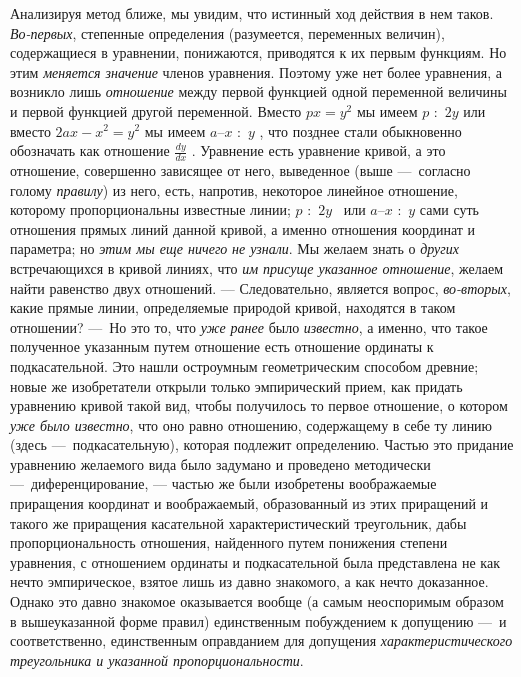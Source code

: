 {Анализируя метод ближе, мы увидим, что истинный ход действия в нем таков.
{\em Во-первых}, степенные определения (разумеется,
переменных величин), содержащиеся в уравнении, понижаются, приводятся к их
первым функциям. Но этим {\em меняется значение} членов
уравнения. Поэтому уже нет более уравнения, а возникло лишь
{\em отношение} между первой функцией одной переменной
величины и первой функцией другой переменной. Вместо  $\mathit{px}=y^2$  мы
имеем  $p\text{~}:\text{~}2y$  или вместо  $2\mathit{ax}-x^2=y^2$ мы имеем 
$a\text{–}x\text{~}:\text{~}y$ , что позднее стали обыкновенно обозначать
как отношение  $\frac{\mathit{dy}}{\mathit{dx}}$ . Уравнение есть уравнение
кривой, а это отношение, совершенно зависящее от него, выведенное (выше
—~согласно голому {\em правилу}) из него, есть,
напротив, некоторое линейное отношение, которому пропорциональны известные
линии;  $p\text{~}:\text{~}2y$  \ или  $a\text{–}x\text{~}:\text{~}y$  сами
суть отношения прямых линий данной кривой, а именно отношения координат и
параметра; но {\em этим мы еще ничего
}{\em не узнали}. Мы желаем знать о
{\em других} встречающихся в кривой линиях, что
{\em им присуще указанное отношение}, желаем найти
равенство двух отношений. — Следовательно, является вопрос,
{\em во-вторых}, какие прямые линии, определяемые
природой кривой, находятся в таком отношении? —~Но это то, что
{\em уже ранее} было
{\em известно}, а именно, что такое полученное
указанным путем отношение есть отношение ординаты к подкасательной. Это
нашли остроумным геометрическим способом древние; новые же изобретатели
открыли только эмпирический прием, как придать уравнению кривой такой вид,
чтобы получилось то первое отношение, о котором
{\em уже было известно}, что оно равно отношению,
содержащему в себе ту линию (здесь —~подкасательную), которая подлежит
определению. Частью это придание уравнению желаемого вида было задумано и
проведено методически —~диференцирование, — частью же были изобретены
воображаемые приращения координат и воображаемый, образованный из этих
приращений и такого же приращения касательной характеристический
треугольник, дабы пропорциональность отношения, найденного путем понижения
степени уравнения, с отношением ординаты и подкасательной была представлена
не как нечто эмпирическое, взятое лишь из давно знакомого, а как нечто
доказанное. Однако это давно знакомое оказывается вообще (а самым
неоспоримым образом в вышеуказанной форме правил) единственным побуждением
к допущению —~и соответственно, единственным оправданием для допущения
{\em характеристического треугольника и указанной
пропорциональности}.

}
